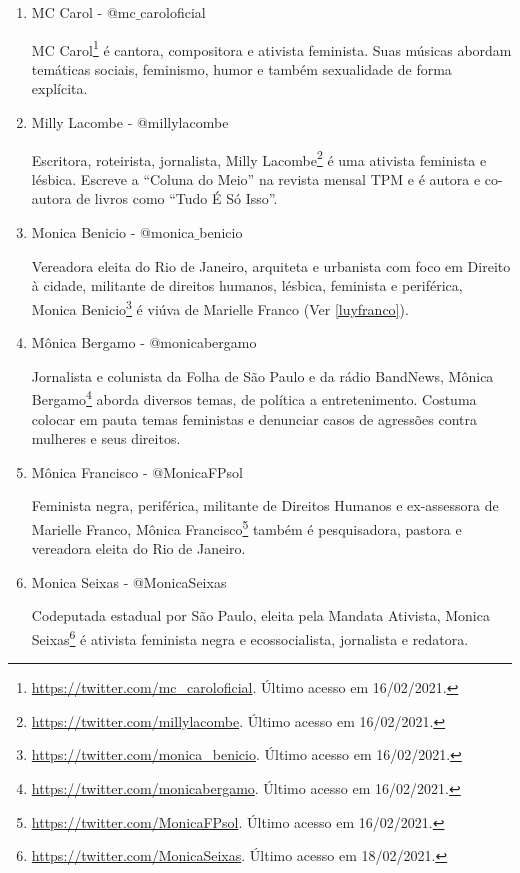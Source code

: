 \documentclass[
	12pt,				%
	openright,			%
	twoside,			%
	a4paper,			%
	english,			%
	brazil				%
	]{abntex2}
\begin{document}
\begin{anexosenv}
\begin{enumerate}
 \item MC Carol - @mc$\_$caroloficial
 
 MC Carol\footnote{\url{https://twitter.com/mc_caroloficial}. Último acesso em 16/02/2021.} é cantora, compositora e ativista feminista. Suas músicas abordam temáticas sociais, feminismo, humor e também sexualidade de forma explícita.

 \item Milly Lacombe - @millylacombe
 
 Escritora, roteirista, jornalista, Milly Lacombe\footnote{\url{https://twitter.com/millylacombe}. Último acesso em 16/02/2021.} é uma ativista feminista e lésbica. Escreve a ``Coluna do Meio'' na revista mensal TPM e é autora e co-autora de livros como ``Tudo É Só Isso''.

 \item Monica Benicio - @monica$\_$benicio\label{monicabenicio}
 
 Vereadora eleita do Rio de Janeiro, arquiteta e urbanista com foco em Direito à cidade, militante de direitos humanos, lésbica, feminista e periférica, Monica Benicio\footnote{\url{https://twitter.com/monica_benicio}. Último acesso em 16/02/2021.} é viúva de Marielle Franco (Ver \ref{luyfranco}).

 \item Mônica Bergamo - @monicabergamo
 
 Jornalista e colunista da Folha de São Paulo e da rádio BandNews, Mônica Bergamo\footnote{\url{https://twitter.com/monicabergamo}. Último acesso em 16/02/2021.} aborda diversos temas, de política a entretenimento. Costuma colocar em pauta temas feministas e denunciar casos de agressões contra mulheres e seus direitos.

 \item Mônica Francisco - @MonicaFPsol
 
 Feminista negra, periférica, militante de Direitos Humanos e ex-assessora de Marielle Franco, Mônica Francisco\footnote{\url{https://twitter.com/MonicaFPsol}. Último acesso em 16/02/2021.} também é pesquisadora, pastora e vereadora eleita do Rio de Janeiro.

 \item Monica Seixas - @MonicaSeixas
 
 Codeputada estadual por São Paulo, eleita pela Mandata Ativista, Monica Seixas\footnote{\url{https://twitter.com/MonicaSeixas}. Último acesso em 18/02/2021.} é ativista feminista negra e ecossocialista, jornalista e redatora.


\end{enumerate}
\end{anexosenv}
\end{document}
